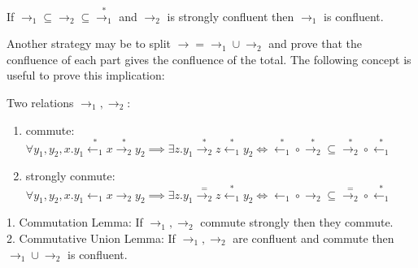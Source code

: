 \begin{corollary}
If $\to_1 \subseteq \to_2 \subseteq \stackrel{*}{\to_1}$ and $\to_2$ is strongly confluent then $\to_1$ is confluent. 
\end{corollary}

Another strategy may be to split $\to = \to_1 \cup \to_2$ and prove that the confluence of each part gives the confluence of the total. The following concept is useful to prove this implication:

\begin{definition}[Commutation]
Two relations $\to_1,\to_2$:

\begin{enumerate}
\item commute: $\forall y_1,y_2,x.y_1 \stackrel{*}{\gets_1} x \stackrel{*}{\to_2} y_2 \implies \exists z.y_1 \stackrel{*}{\to_2} z \stackrel{*}{\gets_1} y_2 \iff \stackrel{*}{\gets_1} \circ \stackrel{*}{\to_2} \subseteq \stackrel{*}{\to_2} \circ \stackrel{*}{\gets_1}$
\item strongly conmute: $\forall y_1,y_2,x.y_1 \gets_1 x \to_2 y_2 \implies \exists z.y_1 \stackrel{=}{\to_2} z \stackrel{*}{\gets_1} y_2 \iff \gets_1 \circ \to_2 \subseteq \stackrel{=}{\to_2} \circ \stackrel{*}{\gets_1}$
\end{enumerate}
\end{definition}

\begin{proposition}
1. Commutation Lemma: If $\to_1,\to_2$ commute strongly then they commute.\\
2. Commutative Union Lemma: If $\to_1,\to_2$ are confluent and commute then $\to_1 \cup \to_2$ is confluent. 
\end{proposition}










